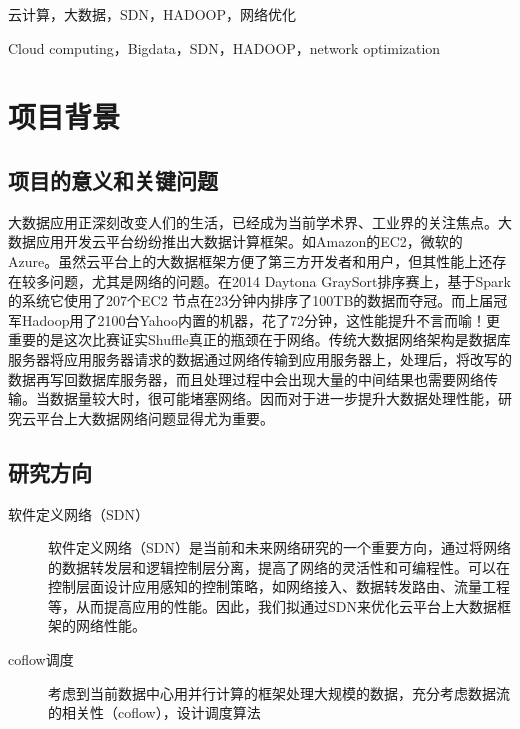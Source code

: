 \documentclass[a4paper, 11pt]{article}                                                   %
\begin{document}
\begin{CJK*}{UTF8}{song}
{ \fontsize{10pt}{15pt}}云计算，大数据，SDN，HADOOP，网络优化
\clearpage
\begin{center}
  { \fontsize{15pt}{18pt}}
\end{center}

{ \fontsize{10pt}{15pt}}Cloud computing，Bigdata，SDN，HADOOP，network optimization
\clearpage
\tableofcontents
\section{项目背景}
\subsection{项目的意义和关键问题}
大数据应用正深刻改变人们的生活，已经成为当前学术界、工业界的关注焦点。大数据应用开发云平台纷纷推出大数据计算框架。如Amazon的EC2，微软的Azure。虽然云平台上的大数据框架方便了第三方开发者和用户，但其性能上还存在较多问题，尤其是网络的问题。在2014 Daytona GraySort排序赛上，基于Spark的系统它使用了207个EC2 节点在23分钟内排序了100TB的数据而夺冠。而上届冠军Hadoop用了2100台Yahoo内置的机器，花了72分钟，这性能提升不言而喻！更重要的是这次比赛证实Shuffle真正的瓶颈在于网络。传统大数据网络架构是数据库服务器将应用服务器请求的数据通过网络传输到应用服务器上，处理后，将改写的数据再写回数据库服务器，而且处理过程中会出现大量的中间结果也需要网络传输。当数据量较大时，很可能堵塞网络。因而对于进一步提升大数据处理性能，研究云平台上大数据网络问题显得尤为重要。\\
\subsection{研究方向}
\begin{description}
  \item[软件定义网络（SDN）] 软件定义网络（SDN）是当前和未来网络研究的一个重要方向，通过将网络的数据转发层和逻辑控制层分离，提高了网络的灵活性和可编程性。可以在控制层面设计应用感知的控制策略，如网络接入、数据转发路由、流量工程等，从而提高应用的性能。因此，我们拟通过SDN来优化云平台上大数据框架的网络性能。
  \item[coflow调度] 考虑到当前数据中心用并行计算的框架处理大规模的数据，充分考虑数据流的相关性（coflow），设计调度算法
\end{description}

\end{CJK*}
\end{document}
